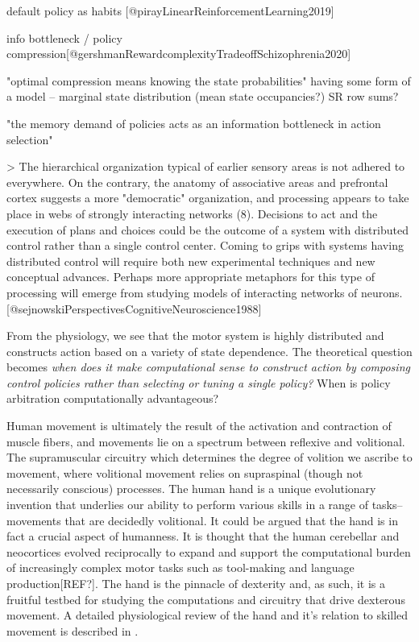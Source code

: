 \documentclass[../main.tex]{subfiles}
\begin{document}
default policy as habits [@pirayLinearReinforcementLearning2019]

info bottleneck / policy compression[@gershmanRewardcomplexityTradeoffSchizophrenia2020] 

"optimal compression means knowing the state probabilities"
having some form of a model -- marginal state distribution (mean state occupancies?) SR row sums?

"the memory demand of policies acts as an information bottleneck in action selection"

> The hierarchical organization typical of earlier sensory areas is not adhered to everywhere. On the contrary, the anatomy of associative areas and prefrontal  cortex suggests a more "democratic"  organization, and  processing  appears to take place  in webs of strongly interacting networks (8). Decisions to act and the execution of plans and  choices  could be the outcome of a  system with  distributed control rather than  a single control center. Coming to grips  with systems having distributed control will require both new experimental techniques and new  conceptual advances. Perhaps more  appropriate  metaphors for this  type of processing will emerge from studying  models of interacting  networks of neurons. [@sejnowskiPerspectivesCognitiveNeuroscience1988]

From the physiology, we see that the motor system is highly distributed and constructs action based on a variety of state dependence. The theoretical question becomes \emph{when does it make computational sense to construct action by composing control policies rather than selecting or tuning a single policy?} When is policy arbitration computationally advantageous?

Human movement is ultimately the result of the activation and contraction of muscle fibers, and movements lie on a spectrum between reflexive and volitional. The supramuscular circuitry which determines the degree of volition we ascribe to movement, where volitional movement relies on supraspinal (though not necessarily conscious) processes. The human hand is a unique evolutionary invention that underlies our ability to perform various skills in a range of tasks-- movements that are decidedly volitional. It could be argued that the hand is in fact a crucial aspect of humanness. It is thought that the human cerebellar and neocortices evolved reciprocally to expand and support the computational burden of increasingly complex motor tasks such as tool-making and language production[REF?]. The hand is the pinnacle of dexterity and, as such, it is a fruitful testbed for studying the computations and circuitry that drive dexterous movement. A detailed physiological review of the hand and it's relation to skilled movement is described in .
\end{document}
